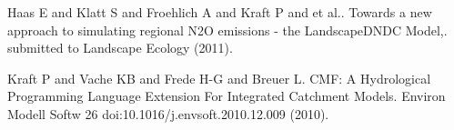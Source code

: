 
\begin{thebibliography}{10}

{\sc Haas E and Klatt S and Froehlich A and Kraft P and et al.}. {Towards a new approach to simulating regional N2O emissions - the LandscapeDNDC Model,}. submitted to Landscape Ecology (2011).



{\sc Kraft P and Vache KB and Frede H-G and Breuer L}. {CMF: A Hydrological Programming Language Extension For Integrated Catchment Models}. Environ Modell Softw 26 doi:10.1016/j.envsoft.2010.12.009 (2010).

\end{thebibliography}
